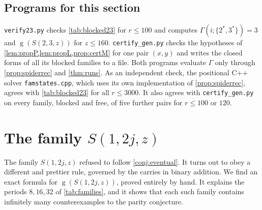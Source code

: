 \documentclass[11pt]{amsart}
\theoremstyle{definition}
\theoremstyle{remark}
\newcommand{\gv}{\operatorname{g}}           %
\newcommand{\si}{\mathsf{i}}
\newcommand{\Sp}{S}
\newcommand{\free}{\ast}
\begin{document}
\begin{table}[t]
\caption{The thresholds $z_0(x,y)$ of \cref{thm:cert}: $\gv(\Sp(x,y,z))=z\bmod 2$ holds for \emph{all} $z\ge z_0(x,y)$, and fails for $z=z_0(x,y)-1$ when $z_0>1$. $\mathrm{A}$: $x\not\equiv y\pmod2$, the spiders violate the parity conjecture for all $z\ge z_0$; $\mathrm{P}$: $x\equiv y\pmod 2$, they satisfy it. A dash marks the excluded pairs $(1,\text{even})$. For $x=2$ and $15\le y\le 40$ the values $y{:}\,z_0(2,y)$ are $15{:}\,74$, $16{:}\,12$, $17{:}\,112$, $18{:}\,12$, $19{:}\,30$, $20{:}\,16$, $21{:}\,44$, $22{:}\,16$, $23{:}\,50$, $24{:}\,20$, $25{:}\,136$, $26{:}\,20$, $27{:}\,38$, $28{:}\,24$, $29{:}\,148$, $30{:}\,24$, $31{:}\,154$, $32{:}\,28$, $33{:}\,224$, $34{:}\,28$, $35{:}\,46$, $36{:}\,32$, $37{:}\,60$, $38{:}\,32$, $39{:}\,66$, $40{:}\,36$. For $y\le 12$ the thresholds coincide with \cref{tab:families}.}
\label{tab:cert}
\end{table}

\subsection*{Programs for this section}
\texttt{verify23.py} checks \cref{tab:blocked23} for $r\le100$ and computes $\Gamma(\si;\{2^\free,3^\free\})=3$ and $\gv(\Sp(2,3,z))$ for $z\le160$. \texttt{certify\_gen.py} checks the hypotheses of \cref{lem:propP,lem:propL,prop:certM} for one pair $(x,y)$ and writes the closed forms of all its blocked families to a file. Both programs evaluate $\Gamma$ only through \cref{prop:spiderrec} and \cref{thm:runs}. As an independent check, the positional C++ solver \texttt{famstates.cpp}, which uses its own implementation of \cref{prop:spiderrec}, agrees with \cref{tab:blocked23} for all $r\le3000$. It also agrees with \texttt{certify\_gen.py} on every family, blocked and free, of five further pairs for $r\le 100$ or $120$.

\section{The family \texorpdfstring{$\Sp(1,2j,z)$}{S(1,2j,z)}}\label{sec:onetwoj}

The family $\Sp(1,2j,z)$ refused to follow \cref{conj:eventual}. It turns out to obey a different and prettier rule, governed by the carries in binary addition. We find an exact formula for $\gv(\Sp(1,2j,z))$, proved entirely by hand. It explains the periods $8,16,32$ of \cref{tab:families}, and it shows that each such family contains infinitely many counterexamples to the parity conjecture.
\end{document}
